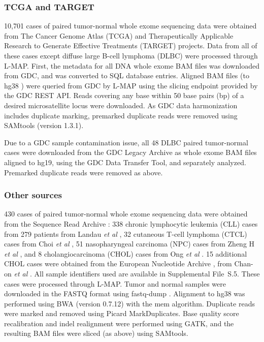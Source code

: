 \subsubsection{TCGA and TARGET}
10,701 cases of paired tumor-normal whole exome sequencing data were obtained from The Cancer Genome Atlas (TCGA) \cite{tcgacoadread,tcgaucec,tcgastad,tcgaov,tcgabrca,tcgalaml,tcgakirc,tcgagbm,tcgablca,tcgaluad,tcgalusc,hoadley2014,tcgakich,tcgathca,tcgahnsc,tcgalgg,tcgaskcm,ciriello2015,tcgakirp,tcgaprad,tcgaacc,tcgaesca,tcgacesc,tcgapcpg} and Therapeutically Applicable Research to Generate Effective Treatments (TARGET) \cite{target,targetnbl} projects. Data from all of these cases except diffuse large B-cell lymphoma (DLBC) were processed through L-MAP\@. First, the metadata for all DNA whole exome BAM files was downloaded from GDC, and was converted to SQL database entries. Aligned BAM files (to hg38 \cite{lander2001}) were queried from GDC by L-MAP using the slicing endpoint provided by the GDC REST API\@. Reads covering any base within 50 base pairs (bp) of a desired microsatellite locus were downloaded. As GDC data harmonization includes duplicate marking, premarked duplicate reads were removed using SAMtools (version 1.3.1).

Due to a GDC sample contamination issue, all 48 DLBC paired tumor-normal cases were downloaded from the GDC Legacy Archive as whole exome BAM files aligned to hg19, using the GDC Data Transfer Tool, and separately analyzed. Premarked duplicate reads were removed as above.

\subsubsection{Other sources}
430 cases of paired tumor-normal whole exome sequencing data were obtained from the Sequence Read Archive \cite{leinonen2010sra}: 338 chronic lymphocytic leukemia (CLL) cases from 279 patients from Landau \textit{et al} \cite{landau2015}, 32 cutaneous T-cell lymphoma (CTCL) cases from Choi \textit{et al} \cite{choi2015}, 51 nasopharyngeal carcinoma (NPC) cases from Zheng H \textit{et al} \cite{zheng2016}, and 8 cholangiocarcinoma (CHOL) cases from Ong \textit{et al} \cite{ong2012}. 15 additional CHOL cases were obtained from the European Nucleotide Archive \cite{leinonen2010ena}, from Chan-on \textit{et al} \cite{chanon2013}. All sample identifiers used are available in Supplemental File~S\thechapter{}.5. These cases were processed through L-MAP\@. Tumor and normal samples were downloaded in the FASTQ format using fastq-dump \cite{leinonen2010sra}. Alignment to hg38 was performed using BWA (version 0.7.12) \cite{bwa} with the mem algorithm. Duplicate reads were marked and removed using Picard MarkDuplicates. Base quality score recalibration and indel realignment were performed using GATK, and the resulting BAM files were sliced (as above) using SAMtools.

